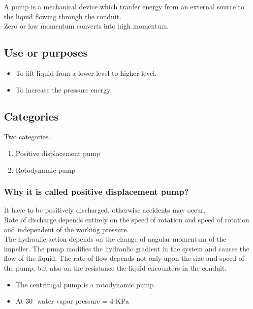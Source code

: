 \documentclass{article}
\begin{document}
\begin{multicols}{2}
A pump is a mechanical device which tranfer energy from an external source to the liquid flowing through the conduit. \\

Zero or low momentum converts into high momentum. \\

\subsection*{Use or purposes}
\begin{itemize}
  \item To lift liquid from a lower level to higher level.
  \item To increase the pressure energy 
\end{itemize}

\subsection*{Categories}
Two categories. \\
\begin{enumerate}
  \item Positive displacement pump 
  \item Rotodynamic pump
\end{enumerate}

\subsubsection*{Why it is called positive displacement pump?}
It have to be positively discharged, otherwise accidents may occur. \\

Rate of discharge depends entirely on the speed of rotation and speed of rotation and independent of the working pressure. \\

The hydraulic action depends on the change of angular momentum of the impeller. The pump modifies the hydraulic gradient in the system and causes the flow of the liquid. The rate of flow depends not only upon the size and speed of the pump, but also on the resistance the liquid encounters in the conduit. \\

\begin{itemize}
  \item The centrifugal pump is a rotodynamic pump.
  \item At $30^\circ$ water vapor pressure = 4 KPa 
\end{itemize}


\end{multicols}
\end{document}

